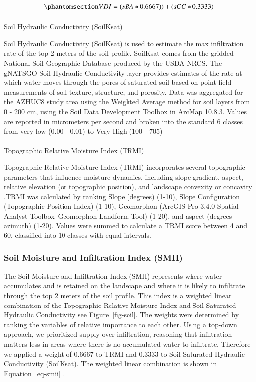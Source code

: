 \documentclass[
  number,
  preprint,
  3p,
  onecolumn]{elsarticle}
\makeatletter
\let\oldparagraph\paragraph
\renewcommand{\paragraph}{
    \@ifstar
      \xxxParagraphStar
      \xxxParagraphNoStar
  }
\newcommand{\xxxParagraphStar}[1]{\oldparagraph*{#1}\mbox{}}
\newcommand{\xxxParagraphNoStar}[1]{\oldparagraph{#1}\mbox{}}
\makeatother
\begin{document}
\begin{equation}\phantomsection\label{eq-vdi}{
VDI  = ( sBA* 0.6667)) + (sCC * 0.3333)
}\end{equation}

\paragraph{Soil Hydraulic Conductivity
(SoilKsat)}\label{soil-hydraulic-conductivity-soilksat}

Soil Hydraulic Conductivity (SoilKsat) is used to estimate the max
infiltration rate of the top 2 meters of the soil profile. SoilKsat
comes from the gridded National Soil Geographic Database produced by the
USDA-NRCS. The gNATSGO Soil Hydraulic Conductivity layer provides
estimates of the rate at which water moves through the pores of
saturated soil based on point field measurements of soil texture,
structure, and porosity. Data was aggregated for the AZHUC8 study area
using the Weighted Average method for soil layers from 0 - 200 cm, using
the Soil Data Development Toolbox in ArcMap 10.8.3. Values are reported
in micrometers per second and broken into the standard 6 classes from
very low (0.00 - 0.01) to Very High (100 - 705)

\paragraph{Topographic Relative Moisture Index
(TRMI)}\label{topographic-relative-moisture-index-trmi}

Topographic Relative Moisture Index (TRMI) incorporates several
topographic parameters that influence moisture dynamics, including slope
gradient, aspect, relative elevation (or topographic position), and
landscape convexity or concavity \citep{parker1982}.TRMI was calculated
by ranking Slope (degrees) (1-10), Slope Configuration (Topographic
Position Index) (1-10), Geomorphon (ArcGIS Pro 3.4.0 Spatial Analyst
Toolbox--Geomorphon Landform Tool) (1-20), and aspect (degrees azimuth)
(1-20). Values were summed to calculate a TRMI score between 4 and 60,
classified into 10-classes with equal intervals.

\subsubsection{Soil Moisture and Infiltration Index
(SMII)}\label{soil-moisture-and-infiltration-index-smii}

The Soil Moisture and Infiltration Index (SMII) represents where water
accumulates and is retained on the landscape and where it is likely to
infiltrate through the top 2 meters of the soil profile. This index is a
weighted linear combination of the Topographic Relative Moisture Index
and Soil Saturated Hydraulic Conductivity see Figure~\ref{fig-soil}. The
weights were determined by ranking the variables of relative importance
to each other. Using a top-down approach, we prioritized supply over
infiltration, reasoning that infiltration matters less in areas where
there is no accumulated water to infiltrate. Therefore we applied a
weight of 0.6667 to TRMI and 0.3333 to Soil Saturated Hydraulic
Conductivity (SoilKsat). The weighted linear combination is shown in
Equation~\ref{eq-smii} .
\end{document}
